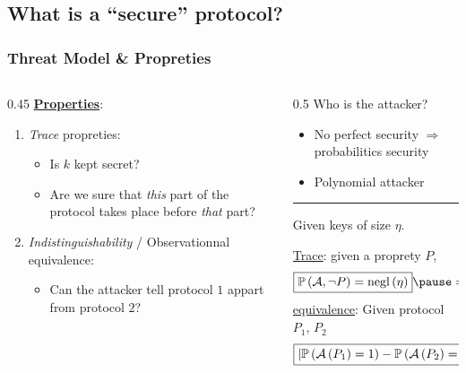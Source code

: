 \documentclass[aspectratio=169]{beamer}
\begin{document}
\subsection{What is a \enquote{secure} protocol?}

\begin{frame}
  \frametitle{Threat Model \& Propreties}

  \begin{columns}
    \begin{column}{0.45\textwidth}
      \underline{\textbf{Properties}}:\pause
      \begin{enumerate}
        \item \emph{Trace} propreties: \pause\begin{itemize}
          \item Is $k$ kept secret?\pause
          \item Are we sure that \textit{this} part of the protocol takes place before \textit{that} part?\pause
        \end{itemize}
        \item \emph{Indistinguishability} / Observationnal equivalence: \pause\begin{itemize}
          \item Can the attacker tell protocol $1$ appart from protocol $2$?
        \end{itemize}
      \end{enumerate}
    \end{column}
    \begin{column}{0.5\textwidth}\pause
      Who is the attacker?
      \begin{itemize}\pause
        \item No perfect security $\Rightarrow$ probabilitics security\pause
        \item Polynomial attacker
      \end{itemize}\pause
      \hrule

      Given keys of size $\eta$.\pause

      \underline{Trace}: given a proprety $P$,
      \[
        \boxed{\mathbb{P}\left( \AAA, \neg P \right) = \mnegl\left( \eta \right)}\pause = o\left( \eta^{-c} \right), c\in \mathbb{Z}
      \]\pause
      \underline{equivalence}: Given protocol $P_1$, $P_2$
      \[
        \boxed{\left| \mathbb{P}\left( \mathcal{A}\left( P_1 \right)=1 \right)-\mathbb{P}\left( \mathcal{A}\left( P_2 \right)=1 \right)\right| = \operatorname{negl}\left( \eta \right)}
      \]
    \end{column}
  \end{columns}
  

\end{frame}
\end{document}
